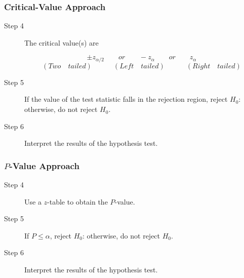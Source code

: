 \documentclass[12pt]{article}
\begin{document}
            \subsubsection*{Critical-Value Approach}
                \begin{description}
                    \item[Step 4] The critical value(s) are
                    \begin{center}
                        \[
                            \pm z _{\alpha/2} \quad\quad or \quad\quad -z_{\alpha} \quad
                            \quad or \quad\quad z_{\alpha}     
                        \]
                        \[
                            (Two \quad tailed)\quad\quad\quad(Left \quad tailed)\quad\quad
                            \quad(Right \quad tailed)
                        \]
                    \end{center}
                    \item[Step 5] If the value of the test statistic falls in the rejection
                    region, reject $H_0$: otherwise, do not reject $H_0$.
                    \item[Step 6] Interpret the results of the hypothesis test.
                \end{description}
            \subsubsection*{$P$-Value Approach}
                \begin{description}
                    \item[Step 4] Use a $z$-table to obtain the $P$-value.
                    \item[Step 5] If $P \leq \alpha$, reject $H_0$: otherwise, do not reject
                    $H_0$.
                    \item[Step 6] Interpret the results of the hypothesis test.
                \end{description}
\end{document}
